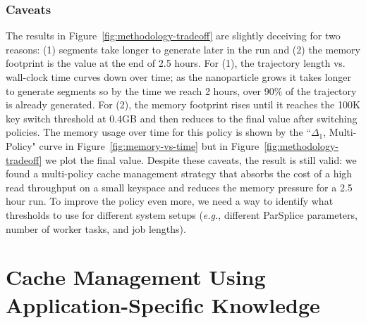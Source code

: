 \subsubsection*{Caveats}

The results in Figure~\ref{fig:methodology-tradeoff} are slightly deceiving for
two reasons: (1) segments take longer to generate later in the run and (2) the
memory footprint is the value at the end of 2.5 hours.  For (1), the trajectory
length vs.  wall-clock time curves down over time; as the nanoparticle grows it
takes longer to generate segments so by the time we reach 2 hours, over 90\% of
the trajectory is already generated.  For (2), the memory footprint rises until
it reaches the 100K key switch threshold at 0.4GB and then reduces to the final
value after switching policies. The memory usage over time for this policy is
shown by the ``\(\Delta_1\), Multi-Policy" curve in
Figure~\ref{fig:memory-vs-time} but in Figure~\ref{fig:methodology-tradeoff} we
plot the final value.  Despite these caveats, the result is still valid: we
found a multi-policy cache management strategy that absorbs the cost of a high
read throughput on a small keyspace and reduces the memory pressure for a 2.5
hour run.  To improve the policy even more, we need a way to identify what
thresholds to use for different system setups ({\it e.g.}, different ParSplice
parameters, number of worker tasks, and job lengths).  

\section{Cache Management Using Application-Specific Knowledge}
\label{sec:dom-specific}

